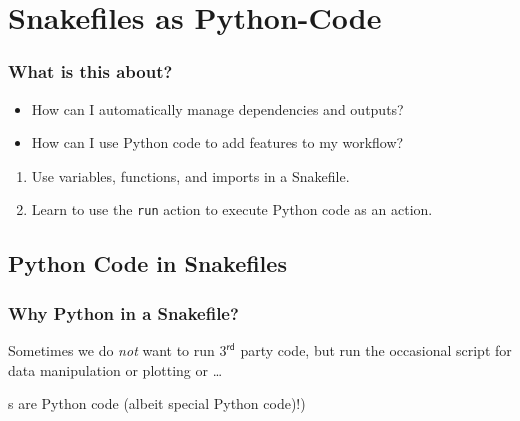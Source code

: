\section{Snakefiles as Python-Code}
{   
}

\begin{frame}
  \frametitle{What is this about?}
   \begin{question}[Questions]
   	 \begin{itemize}
        \item How can I automatically manage dependencies and outputs?
        \item How can I use Python code to add features to my workflow?
     \end{itemize}
   \end{question}
   \begin{docs}[Objectives]
   	  \begin{enumerate}
                      \item Use variables, functions, and imports in a Snakefile. 
                      \item Learn to use the \texttt{run} action to execute Python code as an action.
       \end{enumerate}
   \end{docs}
\end{frame}

\subsection{Python Code in Snakefiles}

\begin{frame}
  \frametitle{Why Python in a Snakefile?}
  Sometimes we do \emph{not} want to run $3^{\mathsf{rd}}$ party code, but run the occasional script for data manipulation   or plotting or \ldots 
  \pause
  \begin{docs}
  	s are Python code (albeit special Python code)!)
  \end{docs}
\end{frame}

